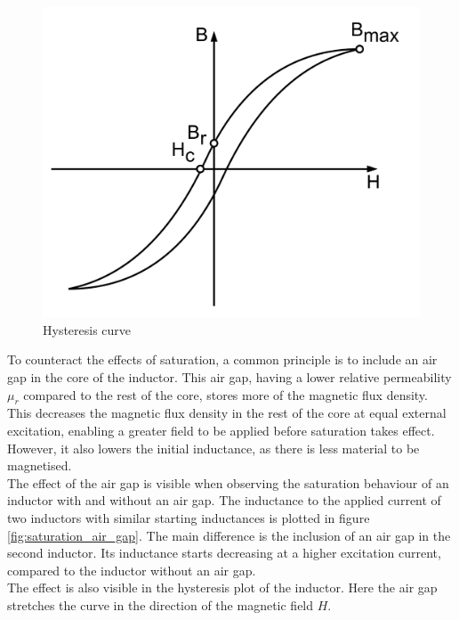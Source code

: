 \begin{figure}[H]
    \centering
    \includegraphics[width=0.5\linewidth]{Bilder//Kapitel2/Hysteresis_simple.pdf}
    \caption{Hysteresis curve}
    \label{fig:hysteresis_curve}
\end{figure}
To counteract the effects of saturation, a common principle is to include an air gap in the core of the inductor. This air gap, having a lower relative permeability $\mu_r$ compared to the rest of the core, stores more of the magnetic flux density. This decreases the magnetic flux density in the rest of the core at equal external excitation, enabling a greater field to be applied before saturation takes effect. However, it also lowers the initial inductance, as there is less material to be magnetised.\\
The effect of the air gap is visible when observing the saturation behaviour of an inductor with and without an air gap. The inductance to the applied current of two inductors with similar starting inductances is plotted in figure \ref{fig:saturation_air_gap}. The main difference is the inclusion of an air gap in the second inductor. Its inductance starts decreasing at a higher excitation current, compared to the inductor without an air gap.\cite{encyclopedia_magnetica}\\
The effect is also visible in the hysteresis plot of the inductor. Here the air gap stretches the curve in the direction of the magnetic field $H$.
